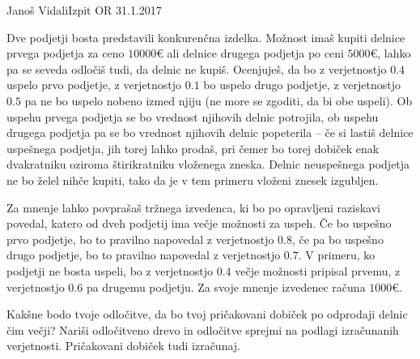 \begin{naloga}{Janoš Vidali}{Izpit OR 31.1.2017}
\begin{vprasanje}
Dve podjetji bosta predstavili konkurenčna izdelka.
Možnost imaš kupiti delnice prvega podjetja za ceno $10000 €$
ali delnice drugega podjetja po ceni $5000 €$,
lahko pa se seveda odločiš tudi, da delnic ne kupiš.
Ocenjuješ, da bo z verjetnostjo $0.4$ uspelo prvo podjetje,
z verjetnostjo $0.1$ bo uspelo drugo podjetje,
z verjetnostjo $0.5$ pa ne bo uspelo nobeno izmed njiju
(ne more se zgoditi, da bi obe uspeli).
Ob uspehu prvega podjetja se bo vrednost njihovih delnic potrojila,
ob uspehu drugega podjetja pa se bo vrednost njihovih delnic popeterila
-- če si lastiš delnice uspešnega podjetja, jih torej lahko prodaš,
pri čemer bo torej dobiček enak
dvakratniku oziroma štirikratniku vloženega zneska.
Delnic neuspešnega podjetja ne bo želel nihče kupiti,
tako da je v tem primeru vloženi znesek izgubljen.

Za mnenje lahko povprašaš tržnega izvedenca,
ki bo po opravljeni raziskavi povedal,
katero od dveh podjetij ima večje možnosti za uspeh.
Če bo uspešno prvo podjetje, bo to pravilno napovedal z verjetnostjo $0.8$,
če pa bo uspešno drugo podjetje,
bo to pravilno napovedal z verjetnostjo $0.7$.
V primeru, ko podjetji ne bosta uspeli,
bo z verjetnostjo $0.4$ večje možnosti pripisal prvemu,
z verjetnostjo $0.6$ pa drugemu podjetju.
Za svoje mnenje izvedenec računa $1000 €$.

Kakšne bodo tvoje odločitve,
da bo tvoj pričakovani dobiček po odprodaji delnic čim večji?
Nariši od\-lo\-čit\-ve\-no drevo
in odločitve sprejmi na podlagi izračunanih verjetnosti.
Pričakovani dobiček tudi izračunaj.
\end{vprasanje}
\begin{odgovor}
\end{odgovor}
\end{naloga}


